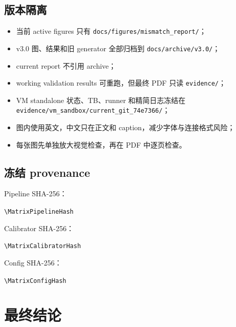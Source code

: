 \documentclass[UTF8,11pt,a4paper]{ctexart}
\newcommand{\code}[1]{\texttt{\small #1}}
\newcommand{\pathcode}[1]{{\small\nolinkurl{#1}}}
\newcommand{\hashvalue}[1]{\begingroup\ttfamily\scriptsize\nolinkurl{#1}\endgroup}
\begin{document}
\subsection{版本隔离}

\begin{itemize}
  \item 当前 active figures 只有 \code{docs/figures/mismatch\_report/}；
  \item v3.0 图、结果和旧 generator 全部归档到 \code{docs/archive/v3.0/}；
  \item current report 不引用 archive；
  \item working validation results 可重跑，但最终 PDF 只读 \code{evidence/}；
  \item VM standalone 状态、TB、runner 和精简日志冻结在
    \pathcode{evidence/vm_sandbox/current_git_74e7366/}；
  \item 图内使用英文，中文只在正文和 caption，减少字体与连接格式风险；
  \item 每张图先单独放大视觉检查，再在 PDF 中逐页检查。
\end{itemize}

\subsection{冻结 provenance}

Pipeline SHA-256：

\begin{notebox}
  \hashvalue{\MatrixPipelineHash}
\end{notebox}

Calibrator SHA-256：

\begin{notebox}
  \hashvalue{\MatrixCalibratorHash}
\end{notebox}

Config SHA-256：

\begin{notebox}
  \hashvalue{\MatrixConfigHash}
\end{notebox}

\section[最终结论]{最终结论}
\end{document}

